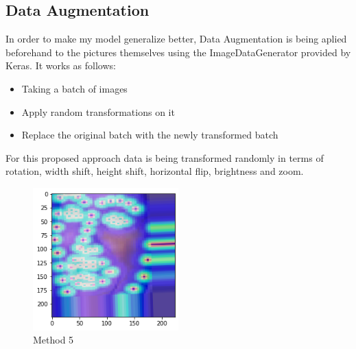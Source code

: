 \subsection{Data Augmentation}
In order to make my model generalize better, Data Augmentation is being aplied beforehand to the pictures themselves using the ImageDataGenerator provided by Keras. It works as follows:
\begin{itemize}
    \item Taking a batch of images
    \item Apply random transformations on it
    \item Replace the original batch with the newly transformed batch
\end{itemize}
For this proposed approach data is being transformed randomly in terms of rotation, width shift, height shift, horizontal flip, brightness and zoom.

\begin{center}
\begin{figure}[H]
  \begin{center}
  \includegraphics[angle=0, width=0.5\textwidth]{Figures/method_5.png}
  \caption{Method 5}
  \label{fig:MachineLearningModelMethod_5}
  \end{center}
\end{figure}
\end{center}


